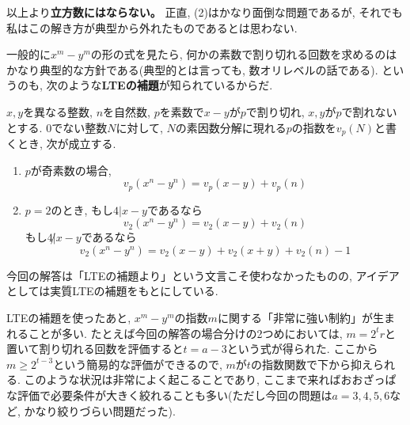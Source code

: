 以上より\textbf{立方数にはならない。}
\newpage 
{}
正直, (2)はかなり面倒な問題であるが, それでも私はこの解き方が典型から外れたものであるとは思わない.\par 
一般的に$x^{m}-y^{m}$の形の式を見たら, 何かの素数で割り切れる回数を求めるのはかなり典型的な方針である(典型的とは言っても, 数オリレベルの話である). というのも, 次のような\textbf{LTEの補題}が知られているからだ. 
\begin{tcolorbox}[title=LTEの補題(Lifting The Exponent lemma)]
$x,y$を異なる整数, $n$を自然数, $p$を素数で$x-y$が$p$で割り切れ, $x,y$が$p$で割れないとする. 0でない整数$N$に対して, $N$の素因数分解に現れる$p$の指数を$v_{p}(N)$と書くとき, 次が成立する. 
\begin{enumerate}
\item $p$が奇素数の場合, 
\[v_p(x^{n} - y^{n}) = v_p(x-y) + v_p(n)\]
\item $p=2$のとき, もし$4|x-y$であるなら
\[v_2(x^{n} - y^{n}) = v_2(x-y) + v_2(n)\]
もし$4\not | x-y$であるなら
\[v_2(x^n - y^n) = v_2(x-y) + v_2(x+y) + v_2(n) - 1\]
\end{enumerate}
\end{tcolorbox}
今回の解答は「LTEの補題より」という文言こそ使わなかったものの, アイデアとしては実質LTEの補題をもとにしている. \par 
LTEの補題を使ったあと, $x^{m} - y^{m}$の指数$m$に関する「非常に強い制約」が生まれることが多い. たとえば今回の解答の場合分けの2つめにおいては, $m=2^{t}r$と置いて割り切れる回数を評価すると$t=a-3$という式が得られた. ここから$m \geq 2^{t-3}$という簡易的な評価ができるので, $m$が$t$の指数関数で下から抑えられる. このような状況は非常によく起こることであり, ここまで来ればおおざっぱな評価で必要条件が大きく絞れることも多い(ただし今回の問題は$a=3,4,5,6$など, かなり絞りづらい問題だった). 

